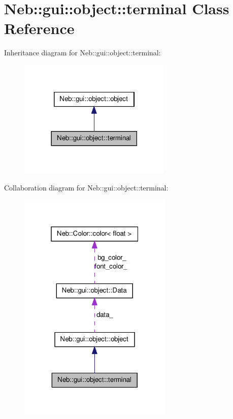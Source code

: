 \hypertarget{classNeb_1_1gui_1_1object_1_1terminal}{\section{\-Neb\-:\-:gui\-:\-:object\-:\-:terminal \-Class \-Reference}
\label{classNeb_1_1gui_1_1object_1_1terminal}
}


\-Inheritance diagram for \-Neb\-:\-:gui\-:\-:object\-:\-:terminal\-:\nopagebreak
\begin{figure}[H]
\begin{center}
\leavevmode
\includegraphics[width=206pt]{classNeb_1_1gui_1_1object_1_1terminal__inherit__graph}
\end{center}
\end{figure}


\-Collaboration diagram for \-Neb\-:\-:gui\-:\-:object\-:\-:terminal\-:\nopagebreak
\begin{figure}[H]
\begin{center}
\leavevmode
\includegraphics[width=208pt]{classNeb_1_1gui_1_1object_1_1terminal__coll__graph}
\end{center}
\end{figure}
